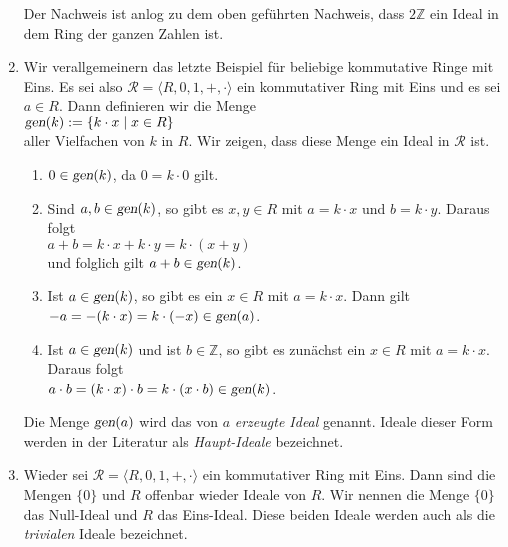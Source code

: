 \begin{enumerate}
      Der Nachweis ist anlog zu dem oben geführten Nachweis, dass $2\mathbb{Z}$ ein Ideal
      in dem Ring der ganzen Zahlen ist.
\item Wir verallgemeinern das letzte Beispiel für beliebige kommutative Ringe mit Eins.
      Es sei also $\mathcal{R} = \langle R, 0, 1, +, \cdot \rangle$ ein kommutativer Ring
      mit Eins und es sei $a \in R$.  Dann definieren wir die Menge
      \\
      \hspace*{1.3cm}
      $\textsl{gen}(k) := \{ k \cdot x \mid x \in R \}$
      \\[0.2cm]
      aller Vielfachen von $k$ in $R$.  Wir zeigen, dass diese Menge ein Ideal in
      $\mathcal{R}$ ist.
      \begin{enumerate}
      \item $0 \in \textsl{gen}(k)$, da $0 = k \cdot 0$ gilt. 
      \item Sind $a, b \in \textsl{gen}(k)$, so gibt es $x,y \in R$ mit $a = k \cdot x$ und 
            $b = k \cdot y$.  Daraus folgt
            \\[0.2cm]
            \hspace*{1.3cm}
            $a + b = k \cdot x + k \cdot y = k \cdot (x + y)$
            \\[0.2cm]
            und folglich gilt $a+b \in \textsl{gen}(k)$.
      \item Ist $a \in \textsl{gen}(k)$, so gibt es ein $x \in R$ mit $a = k \cdot x$.  Dann gilt
            \\[0.2cm]
            \hspace*{1.3cm}
            $-a = - (k \cdot x) = k \cdot (-x) \in \textsl{gen}(a)$.
      \item Ist $a \in \textsl{gen}(k)$ und ist $b \in \mathbb{Z}$, so gibt es zunächst ein
            $x \in R$ mit $a = k \cdot x$.  Daraus folgt
            \\[0.2cm]
            \hspace*{1.3cm}
            $a \cdot b = (k \cdot x) \cdot b = k \cdot (x \cdot b) \in \textsl{gen}(k)$.
      \end{enumerate}
      Die Menge $\textsl{gen}(a)$ wird das von $a$ \emph{erzeugte Ideal} genannt.
      Ideale dieser Form werden in der Literatur als \emph{Haupt-Ideale} bezeichnet.
\item Wieder sei $\mathcal{R} = \langle R, 0, 1, +, \cdot \rangle$ ein kommutativer Ring mit Eins.  Dann
      sind die Mengen $\{0\}$ und $R$ offenbar wieder Ideale von $R$.  Wir nennen  die Menge $\{0\}$
      das Null-Ideal und $R$ das Eins-Ideal.  Diese beiden Ideale werden auch als die \emph{trivialen}
      Ideale bezeichnet.
      \eox
\end{enumerate}


